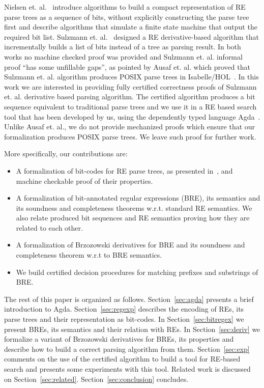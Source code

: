 \documentclass[sigconf]{acmart}
\theoremstyle{definition}
\begin{document}
Nielsen et. al.~\cite{Nielsen2011} introduce algorithms to build a compact representation of
RE parse trees as a sequence of bits, without explicitly constructing the parse tree first
and describe algorithms that simulate a finite state machine that output the required bit list. 
Sulzmann et. al.~\cite{SulzmannL14} designed a RE derivative-based algorithm
that incrementally builds a list of bits instead of a tree as parsing result. In both works
no machine checked proof was provided and Sulzmann et. al. informal proof ``has some unfillable gaps'', 
as pointed by Ausaf et. al. which proved that Sulzmann et. al. algorithm produces POSIX parse trees 
in Isabelle/HOL~\cite{AusafDU16}. In this work we are interested in providing fully 
certified correctness proofs of Sulzmann et. al. derivative based parsing algorithm. The certified 
algorithm produces a bit sequence equivalent to traditional parse trees and we use it 
in a RE based search tool that has been developed by us, using the dependently typed language
Agda~\cite{Norell2009}. Unlike Ausaf et. al., we do not provide mechanized proofs which ensure
that our formalization produces POSIX parse trees. We leave such proof for further work.

More specifically, our contributions are:
\begin{itemize}
  \item A formalization of bit-codes for RE parse trees, as presented in~\cite{Nielsen2011},
        and machine checkable proof of their properties.
  \item A formalization of bit-annotated regular expressions (BRE), its semantics 
        and its soundness and completeness theorems w.r.t. standard RE semantics. 
        We also relate produced bit sequences and RE semantics proving how they 
        are related to each other.
  \item A formalization of Brzozowski derivatives for BRE and its soundness and
        completeness theorem w.r.t to BRE semantics.
  \item We build certified decision procedures for matching prefixes and substrings
        of BRE.
\end{itemize}

The rest of this paper is organized as follows. Section~\ref{sec:agda}
presents a brief introduction to Agda. Section~\ref{sec:regexp}
describes the encoding of REs, its parse trees and their representation as 
bit-codes. In Section~\ref{sec:bitregex} we present BREs, 
its semantics and their relation with REs. In Section~\ref{sec:deriv} 
we formalize a variant of Brzozowski derivatives for BREs, its 
properties and describe how to build a correct parsing algorithm from them. 
Section~\ref{sec:exp} comments on the use of the certified algorithm to build a tool for
RE-based search and presents some experiments with this tool. Related
work is discussed on Section~\ref{sec:related}. Section~\ref{sec:conclusion} concludes.
\end{document}
